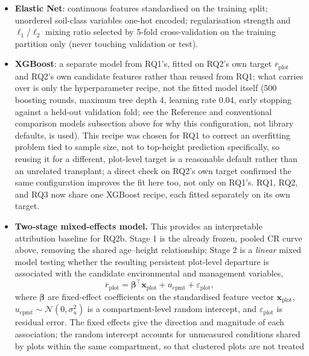 \documentclass[11pt,a4paper]{report}
\begin{document}
\begin{itemize}
\setlength\itemsep{0pt}
\item \textbf{Elastic Net}: continuous features standardised on the training split; unordered
  soil-class variables one-hot encoded; regularisation strength and $\ell_1$/$\ell_2$ mixing
  ratio selected by 5-fold cross-validation on the training partition only (never touching
  validation or test).
\item \textbf{XGBoost}: a separate model from RQ1's, fitted on RQ2's own target
  $\overline{r}_{\text{plot}}$ and RQ2's own candidate features rather than reused from RQ1;
  what carries over is only the hyperparameter recipe, not the fitted model itself (500 boosting
  rounds, maximum tree depth 4, learning rate 0.04, early stopping against a held-out validation
  fold; see the Reference and conventional comparison models subsection above for why this
  configuration, not library defaults, is used). This recipe was chosen for RQ1 to correct an
  overfitting problem tied to sample size, not to top-height prediction specifically, so reusing
  it for a different, plot-level target is a reasonable default rather than an unrelated
  transplant; a direct check on RQ2's own target confirmed the same configuration improves the
  fit here too, not only on RQ1's. RQ1, RQ2, and RQ3 now share one XGBoost recipe, each fitted
  separately on its own target.
\item \textbf{Two-stage mixed-effects model.} This provides an interpretable attribution baseline
  for RQ2b. Stage 1 is the already frozen, pooled CR curve above, removing the shared age--height
  relationship; Stage 2 is a \emph{linear} mixed model testing whether the resulting persistent
  plot-level departure is associated with the candidate environmental and management variables,
  \begin{equation}
  \overline{r}_{\text{plot}} = \boldsymbol{\beta}^{\top}\mathbf{x}_{\text{plot}} +
  u_{\text{cpmt}} + \varepsilon_{\text{plot}},
  \label{eq:mixed-effects}
  \end{equation}
  where $\boldsymbol{\beta}$ are fixed-effect coefficients on the standardised feature vector
  $\mathbf{x}_{\text{plot}}$, $u_{\text{cpmt}}\sim\mathcal{N}(0,\sigma_u^2)$ is a compartment-level
  random intercept, and $\varepsilon_{\text{plot}}$ is residual error. The fixed effects give the
  direction and magnitude of each association; the random intercept accounts for unmeasured
  conditions shared by plots within the same compartment, so that clustered plots are not treated

\end{itemize}
\end{document}
